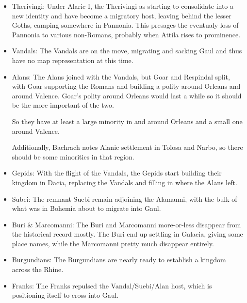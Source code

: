 \documentclass{article}
\begin{document}
\begin{itemize}
		\item Therivingi:\newline
		Under Alaric I, the Therivingi as starting to consolidate into a new identity and have become a migratory host, leaving behind the lesser Goths, camping somewhere in Pannonia.
		This presages the eventualy loss of Pannonia to various non-Romans, probably when Attila rises to prominence.
		
		\item Vandals:\newline
		The Vandals are on the move, migrating and sacking Gaul and thus have no map representation at this time.
		
		\item Alans:\newline
		The Alans joined with the Vandals, but Goar and Respindal split, with Goar supporting the Romans and building a polity around Orleans and around Valence.
		Goar's polity around Orleans would last a while so it should be the more important of the two.
		
		So they have at least a large minority in and around Orleans and a small one around Valence.
		
		Additionally, Bachrach notes Alanic settlement in Tolosa and Narbo, so there should be some minorities in that region.
		
		\item Gepids:\newline
		With the flight of the Vandals, the Gepids start building their kingdom in Dacia, replacing the Vandals and filling in where the Alans left.
		
		\item Subei:\newline
		The remnant Suebi remain adjoining the Alamanni, with the bulk of what was in Bohemia about to migrate into Gaul.
		
		\item Buri \& Marcomanni:\newline
		The Buri and Marcomanni more-or-less disappear from the historical record mostly.
		The Buri end up settling in Galacia, giving some place names, while the Marcomanni pretty much disappear entirely.
		
		\item Burgundians:\newline
		The Burgundians are nearly ready to establish a kingdom across the Rhine.
		
		\item Franks:\newline
		The Franks repulsed the Vandal/Suebi/Alan host, which is positioning itself to cross into Gaul.
		

\end{itemize}
\end{document}
